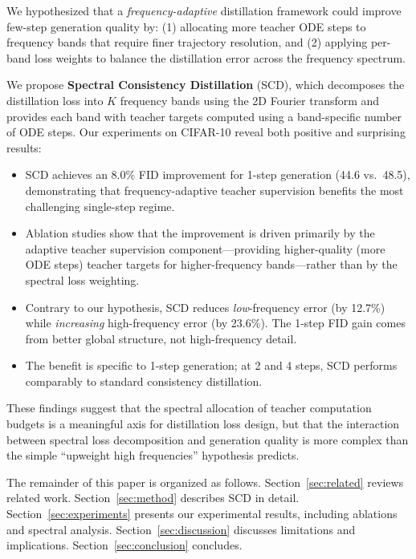 \documentclass{article}
\newcommand{\scd}{\textsc{SCD}}
\begin{document}
We hypothesized that a \emph{frequency-adaptive} distillation framework could improve few-step generation quality by: (1) allocating more teacher ODE steps to frequency bands that require finer trajectory resolution, and (2) applying per-band loss weights to balance the distillation error across the frequency spectrum.

We propose \textbf{Spectral Consistency Distillation} (\scd{}), which decomposes the distillation loss into $K$ frequency bands using the 2D Fourier transform and provides each band with teacher targets computed using a band-specific number of ODE steps.
Our experiments on CIFAR-10 reveal both positive and surprising results:

\begin{itemize}
    \item \scd{} achieves an 8.0\% FID improvement for 1-step generation (44.6 vs.\ 48.5), demonstrating that frequency-adaptive teacher supervision benefits the most challenging single-step regime.

    \item Ablation studies show that the improvement is driven primarily by the adaptive teacher supervision component---providing higher-quality (more ODE steps) teacher targets for higher-frequency bands---rather than by the spectral loss weighting.

    \item Contrary to our hypothesis, \scd{} reduces \emph{low}-frequency error (by 12.7\%) while \emph{increasing} high-frequency error (by 23.6\%). The 1-step FID gain comes from better global structure, not high-frequency detail.

    \item The benefit is specific to 1-step generation; at 2 and 4 steps, \scd{} performs comparably to standard consistency distillation.
\end{itemize}

These findings suggest that the spectral allocation of teacher computation budgets is a meaningful axis for distillation loss design, but that the interaction between spectral loss decomposition and generation quality is more complex than the simple ``upweight high frequencies'' hypothesis predicts.

The remainder of this paper is organized as follows. Section~\ref{sec:related} reviews related work. Section~\ref{sec:method} describes \scd{} in detail. Section~\ref{sec:experiments} presents our experimental results, including ablations and spectral analysis. Section~\ref{sec:discussion} discusses limitations and implications. Section~\ref{sec:conclusion} concludes.
\end{document}
